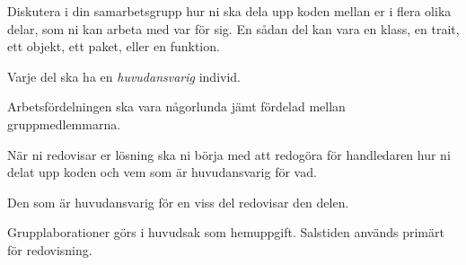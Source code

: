 \item 
Diskutera i din samarbetsgrupp hur ni ska dela upp koden mellan er i flera olika delar, som ni kan arbeta med var för sig. En sådan del kan vara en klass, en trait, ett objekt, ett paket, eller en funktion. 
\item
Varje del ska ha en \emph{huvudansvarig} individ. 
\item
Arbetsfördelningen ska vara någorlunda jämt fördelad mellan gruppmedlemmarna.
\item
När ni redovisar er lösning ska ni börja med att redogöra för handledaren hur ni delat upp koden och vem som är huvudansvarig för vad. 
\item
Den som är huvudansvarig för en viss del redovisar den delen.
\item 
Grupplaborationer görs i huvudsak som hemuppgift. Salstiden används primärt för redovisning.